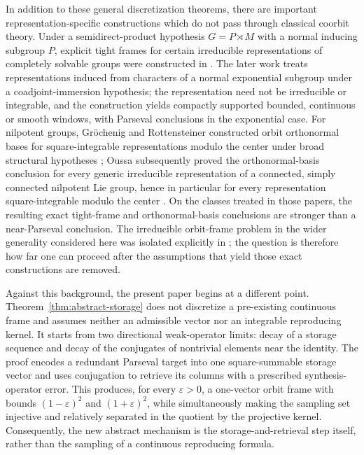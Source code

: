\documentclass[reqno]{amsart}
\numberwithin{equation}{section}
\theoremstyle{definition}
\theoremstyle{remark}
\begin{document}
In addition to these general discretization theorems, there are important
representation-specific constructions which do not pass through classical
coorbit theory.  Under a semidirect-product hypothesis
$G=P\rtimes M$ with a normal inducing subgroup $P$, explicit tight frames for
certain irreducible representations of completely solvable groups were
constructed in \cite{Oussa2018}.  The later work \cite{Oussa2019} treats
representations induced from characters of a normal exponential subgroup
under a coadjoint-immersion hypothesis; the representation need not be
irreducible or integrable, and the construction yields compactly supported
bounded, continuous or smooth windows, with Parseval conclusions in the
exponential case.  For nilpotent groups, Gr\"ochenig and Rottensteiner
constructed orbit orthonormal bases for square-integrable representations
modulo the center under broad structural hypotheses
\cite{GrochenigRottensteiner2018}; Oussa subsequently proved the
orthonormal-basis conclusion for every generic irreducible representation of
a connected, simply connected nilpotent Lie group, hence in particular for
every representation square-integrable modulo the center \cite{Oussa2024}.
On the classes treated in those papers, the resulting exact tight-frame and
orthonormal-basis conclusions are stronger than a near-Parseval conclusion.
The irreducible orbit-frame problem in the wider generality considered here
was isolated explicitly in \cite{Oussa2026}; the question is therefore how
far one can proceed after the assumptions that yield those exact
constructions are removed.

Against this background, the present paper begins at a different point.
Theorem~\ref{thm:abstract-storage} does not discretize a pre-existing
continuous frame and assumes neither an admissible vector nor an integrable
reproducing kernel.  It starts from two directional weak-operator limits:
decay of a storage sequence and decay of the conjugates of nontrivial elements
near the identity.  The proof encodes a redundant Parseval target into one
square-summable storage vector and uses conjugation to retrieve its columns
with a prescribed synthesis-operator error.  This produces, for every
$\varepsilon>0$, a one-vector orbit frame with bounds
$(1-\varepsilon)^2$ and $(1+\varepsilon)^2$, while simultaneously making the
sampling set injective and relatively separated in the quotient by the
projective kernel.  Consequently, the new abstract mechanism is the
storage-and-retrieval step itself, rather than the sampling of a continuous
reproducing formula.
\end{document}

